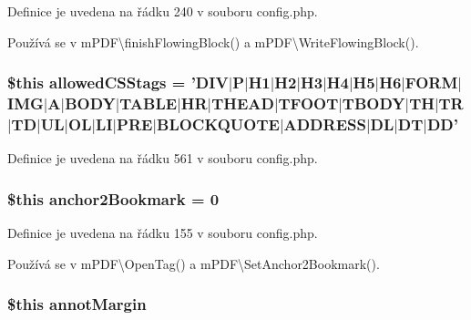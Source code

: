 Definice je uvedena na řádku 240 v souboru config.\-php.



Používá se v m\-P\-D\-F\textbackslash{}finish\-Flowing\-Block() a m\-P\-D\-F\textbackslash{}\-Write\-Flowing\-Block().

\hypertarget{config_8php_a47f216504b9328e6307ee0d9d3cbe0ba}{
\subsubsection[{allowed\-C\-S\-Stags}]{\setlength{\rightskip}{0pt plus 5cm}\$this allowed\-C\-S\-Stags = 'D\-I\-V$|$P$|$H1$|$H2$|$H3$|$H4$|$H5$|$H6$|$F\-O\-R\-M$|$I\-M\-G$|$A$|$B\-O\-D\-Y$|$T\-A\-B\-L\-E$|$H\-R$|$T\-H\-E\-A\-D$|$T\-F\-O\-O\-T$|$T\-B\-O\-D\-Y$|$T\-H$|$T\-R$|$T\-D$|$U\-L$|$O\-L$|$L\-I$|$P\-R\-E$|$B\-L\-O\-C\-K\-Q\-U\-O\-T\-E$|$A\-D\-D\-R\-E\-S\-S$|$D\-L$|$D\-T$|$D\-D'}}\label{config_8php_a47f216504b9328e6307ee0d9d3cbe0ba}


Definice je uvedena na řádku 561 v souboru config.\-php.

\hypertarget{config_8php_a8ac4678cf6d870bd789cf4ea72236a70}{
\subsubsection[{anchor2\-Bookmark}]{\setlength{\rightskip}{0pt plus 5cm}\$this anchor2\-Bookmark = 0}}\label{config_8php_a8ac4678cf6d870bd789cf4ea72236a70}


Definice je uvedena na řádku 155 v souboru config.\-php.



Používá se v m\-P\-D\-F\textbackslash{}\-Open\-Tag() a m\-P\-D\-F\textbackslash{}\-Set\-Anchor2\-Bookmark().

\hypertarget{config_8php_ad2857b9ce8d1f02a000da38c1ac8fc8c}{
\subsubsection[{annot\-Margin}]{\setlength{\rightskip}{0pt plus 5cm}\$this annot\-Margin}}\label{config_8php_ad2857b9ce8d1f02a000da38c1ac8fc8c}


